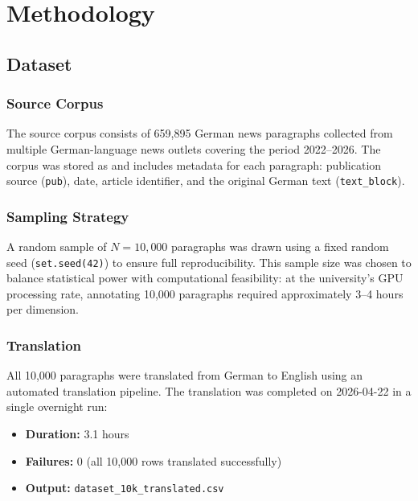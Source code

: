 \section{Methodology}
\label{sec:methodology}

\subsection{Dataset}

\subsubsection{Source Corpus}

The source corpus consists of 659,895 German news paragraphs collected from multiple German-language news outlets covering the period 2022--2026. The corpus was stored as  and includes metadata for each paragraph: publication source (\texttt{pub}), date, article identifier, and the original German text (\texttt{text\_block}).

\subsubsection{Sampling Strategy}

A random sample of $N = 10{,}000$ paragraphs was drawn using a fixed random seed (\texttt{set.seed(42)}) to ensure full reproducibility. This sample size was chosen to balance statistical power with computational feasibility: at the university's GPU processing rate, annotating 10,000 paragraphs required approximately 3--4 hours per dimension.

\subsubsection{Translation}

All 10,000 paragraphs were translated from German to English using an automated translation pipeline. The translation was completed on 2026-04-22 in a single overnight run:

\begin{itemize}
    \item \textbf{Duration:} 3.1 hours
    \item \textbf{Failures:} 0 (all 10,000 rows translated successfully)
    \item \textbf{Output:} \texttt{dataset\_10k\_translated.csv}
\end{itemize}

